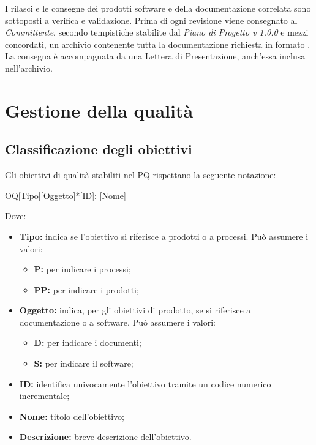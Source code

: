 \documentclass[../NormediProgetto.tex]{subfiles}
\begin{document}
I rilasci e le consegne dei prodotti software e della documentazione correlata sono sottoposti a verifica e validazione. Prima di ogni revisione viene consegnato al \textit{Committente}, secondo tempistiche stabilite dal \textit{Piano di Progetto v 1.0.0} e mezzi concordati, un archivio contenente tutta la documentazione richiesta in formato . La consegna è accompagnata da una Lettera di
Presentazione, anch'essa inclusa nell'archivio.


\section{Gestione della qualità}

\subsection{Classificazione degli obiettivi}

Gli obiettivi di qualità stabiliti nel PQ rispettano la seguente notazione:

    \begin{center}
        OQ[Tipo][Oggetto]*[ID]: [Nome]
    \end{center}
    
Dove:

\begin{itemize}
    \item \textbf{Tipo:} indica se l'obiettivo si riferisce a prodotti o a processi. Può assumere i valori:
    
    \begin{itemize}
        \item \textbf{P:} per indicare i processi;
        \item \textbf{PP:} per indicare i prodotti;
    \end{itemize}
    
    \item \textbf{Oggetto:} indica, per gli obiettivi di prodotto, se si riferisce a documentazione o a software. Può assumere i valori:
    
    \begin{itemize}
        \item \textbf{D:} per indicare i documenti;
        \item \textbf{S:} per indicare il software;
    \end{itemize}
    
    \item \textbf{ID:} identifica univocamente l'obiettivo tramite un codice numerico incrementale;
    
    \item \textbf{Nome:} titolo dell'obiettivo;
    
    \item \textbf{Descrizione:} breve descrizione dell'obiettivo.
\end{itemize}
\end{document}
